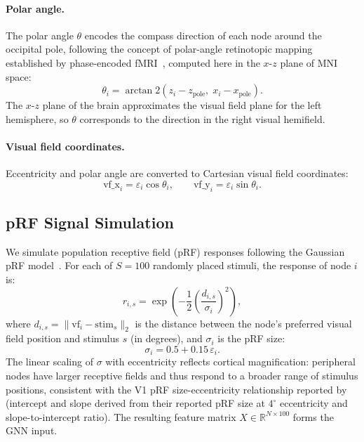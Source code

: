 \paragraph{Polar angle.}
The polar angle $\theta$ encodes the compass direction of each node around the occipital pole,
following the concept of polar-angle retinotopic mapping established by phase-encoded fMRI~\cite{sereno1995borders},
computed here in the $x$-$z$ plane of MNI space:
\begin{equation}
  \theta_i = \arctan2\!\left(z_i - z_\text{pole},\; x_i - x_\text{pole}\right).
\end{equation}
The $x$-$z$ plane of the brain approximates the visual field plane for the left hemisphere,
so $\theta$ corresponds to the direction in the right visual hemifield.

\paragraph{Visual field coordinates.}
Eccentricity and polar angle are converted to Cartesian visual field coordinates:
\begin{equation}
  \mathrm{vf\_x}_i = \varepsilon_i \cos\theta_i, \qquad
  \mathrm{vf\_y}_i = \varepsilon_i \sin\theta_i.
\end{equation}

\subsection{pRF Signal Simulation}

We simulate population receptive field (pRF) responses following the Gaussian pRF model~\cite{dumoulin2008}.
For each of $S = 100$ randomly placed stimuli, the response of node $i$ is:
\begin{equation}
  r_{i,s} = \exp\!\left(-\frac{1}{2}\left(\frac{d_{i,s}}{\sigma_i}\right)^{\!2}\right),
\end{equation}
where $d_{i,s} = \|\mathrm{vf}_i - \mathrm{stim}_s\|_2$ is the distance between the node's preferred
visual field position and stimulus $s$ (in degrees), and $\sigma_i$ is the pRF size:
\begin{equation}
  \sigma_i = 0.5 + 0.15\,\varepsilon_i.
\end{equation}
The linear scaling of $\sigma$ with eccentricity reflects cortical magnification:
peripheral nodes have larger receptive fields and thus respond to a broader range of stimulus positions,
consistent with the V1 pRF size-eccentricity relationship reported by~\citet{harvey2011}
(intercept and slope derived from their reported pRF size at $4^\circ$ eccentricity and slope-to-intercept ratio).
The resulting feature matrix $X \in \mathbb{R}^{N \times 100}$ forms the GNN input.

